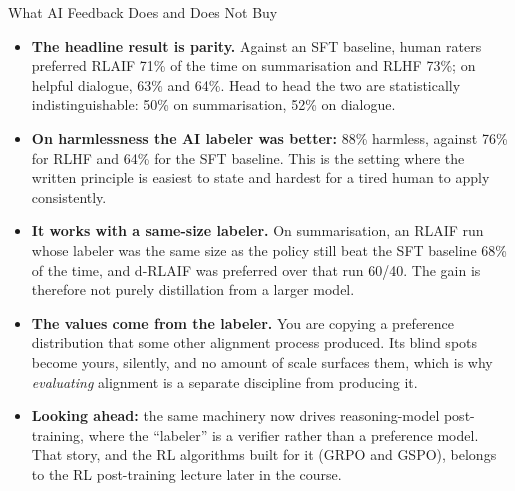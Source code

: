 \begin{frame}[t,allowframebreaks]{What AI Feedback Does and Does Not Buy}
  \begin{itemize}\itemsep0.35em
    \item[\textcolor{red}{$\blacktriangleright$}] \textbf{The headline result is parity.} Against an SFT baseline, human raters preferred RLAIF 71\% of the time on summarisation and RLHF 73\%; on helpful dialogue, 63\% and 64\%. Head to head the two are statistically indistinguishable: 50\% on summarisation, 52\% on dialogue.
    \item[\textcolor{red}{$\blacktriangleright$}] \textbf{On harmlessness the AI labeler was better:} 88\% harmless, against 76\% for RLHF and 64\% for the SFT baseline. This is the setting where the written principle is easiest to state and hardest for a tired human to apply consistently.
    \item[\textcolor{red}{$\blacktriangleright$}] \textbf{It works with a same-size labeler.} On summarisation, an RLAIF run whose labeler was the same size as the policy still beat the SFT baseline 68\% of the time, and d-RLAIF was preferred over that run 60/40. The gain is therefore not purely distillation from a larger model.
    \item[\textcolor{red}{$\blacktriangleright$}] \textbf{The values come from the labeler.} You are copying a preference distribution that some other alignment process produced. Its blind spots become yours, silently, and no amount of scale surfaces them, which is why \emph{evaluating} alignment is a separate discipline from producing it.
    \item[\textcolor{red}{$\blacktriangleright$}] \textbf{Looking ahead:} the same machinery now drives reasoning-model post-training, where the ``labeler'' is a verifier rather than a preference model. That story, and the RL algorithms built for it (GRPO and GSPO), belongs to the RL post-training lecture later in the course.
  \end{itemize}
\end{frame}

